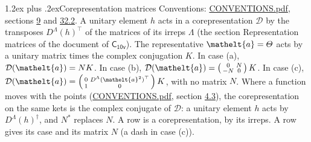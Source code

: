 \documentclass[10pt,a4paper]{article}
\makeatletter
\renewcommand\section{\@startsection{section}{1}{\z@}{-3ex plus -1ex minus -.2ex}%
  {1.2ex plus .2ex}{\normalfont\large\sffamily\bfseries\color{parttitle}}}
\numberwithin{equation}{section}
\newcommand{\eltfont}[1]{{\let\sigma\eltsigma\mathelt{#1}}}
\newcommand{\grp}[1]{\mathsf{#1}}
\newcommand{\elt}[1]{\eltfont{#1}}
\makeatother
\begin{document}
\section{Corepresentation matrices}\label{s:corep_matrices}
Conventions: \href{../../CONVENTIONS.pdf}{CONVENTIONS.pdf}, sections \href{../../../rotation/CONVENTIONS.pdf\#conv.9}{9} and \href{../../CONVENTIONS.pdf\#conv.32.2}{32.2}.
A unitary element $h$ acts in a corepresentation $\mathcal{D}$ by the transposes $D^{\Lambda}(h)^{\top}$ of the matrices of its irreps $\Lambda$ (the section Representation matrices of the document of \href{../../../rotation/data/pdf/C10v.pdf}{$\grp{C_{10v}}$}). The representative $\elt{a} = \varTheta$ acts by a unitary matrix times the complex conjugation $K$.
In case (a), $\mathcal{D}(\elt{a}) = NK$. In case (b), $\mathcal{D}(\elt{a}) = \left(\begin{smallmatrix} 0 & N \\ -N & 0 \end{smallmatrix}\right) K$. In case (c), $\mathcal{D}(\elt{a}) = \left(\begin{smallmatrix} 0 & D^{\Lambda}(\elt{a}^2)^{\top} \\ 1 & 0 \end{smallmatrix}\right) K$, with no matrix $N$.
Where a function moves with the points (\href{../../CONVENTIONS.pdf}{CONVENTIONS.pdf}, section \href{../../../rotation/CONVENTIONS.pdf\#conv.4.3}{4.3}), the corepresentation on the same kets is the complex conjugate of $\mathcal{D}$: a unitary element $h$ acts by $D^{\Lambda}(h)^{\dagger}$, and $N^{*}$ replaces $N$.
A row is a corepresentation, by its irreps. A row gives its case and its matrix $N$ (a dash in case (c)).
\end{document}
